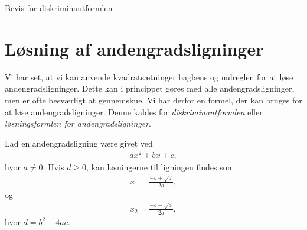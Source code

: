 
\begin{center}
\Huge
	Bevis for diskriminantformlen
\end{center}

\section*{Løsning af andengradsligninger}
Vi har set, at vi kan anvende kvadratsætninger baglæns og nulreglen for at løse andengradsligninger. Dette kan i princippet gøres med alle andengradsligninger, men er ofte besværligt at gennemskue. Vi har derfor en formel, der kan bruges for at løse andengradsligninger. Denne kaldes for \textit{diskriminantformlen} eller \textit{løsningsformlen for andengradsligninger}.
\begin{setn}[Diskriminantformlen]
	Lad en andengradsligning være givet ved
	\begin{align*}
		ax^2 + bx + c,
	\end{align*}
	hvor $a \neq 0$. Hvis $d \geq 0$, kan løsningerne til ligningen findes som
	\begin{align*}
		x_1 = \frac{-b+ \sqrt{d}}{2a},
	\end{align*}
	og
	\begin{align*}
		x_2 = \frac{-b - \sqrt{d}}{2a},
	\end{align*}
	hvor $d = b^2 - 4ac$. 
\end{setn}

